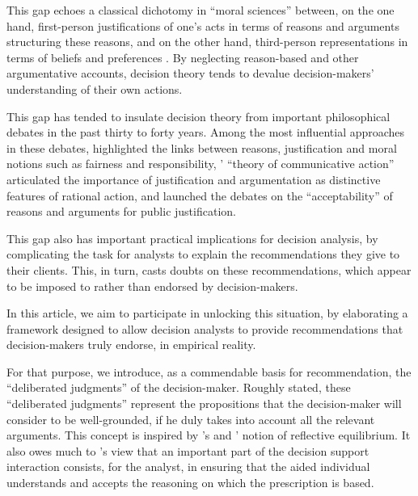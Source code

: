 \documentclass[smallextended,nospthms, natbib]{svjour3}
\begin{document}
This gap echoes a classical dichotomy in “moral sciences” between, on the one hand, first-person justifications of one's acts in terms of reasons and arguments structuring these reasons, and on the other hand, third-person representations in terms of beliefs and preferences \citep{hausman_preference_2011}. By neglecting reason-based and other argumentative accounts, decision theory tends to devalue decision-makers' understanding of their own actions.

This gap has tended to insulate decision theory from important philosophical debates in the past thirty to forty years. Among the most influential approaches in these debates, \citet{scanlon_what_2000} highlighted the links between reasons, justification and moral notions such as fairness and responsibility, \citeauthor{habermas_theorie_1981}’ \citeyearpar{habermas_theorie_1981} “theory of communicative action” articulated the importance of justification and argumentation as distinctive features of rational action, and \citet{rawls_political_2005} launched the debates on the “acceptability” \citep{estlund_democratic_2009} of reasons and arguments for public justification.

This gap also has important practical implications for decision analysis, by complicating the task for analysts to explain the recommendations they give to their clients. This, in turn, casts doubts on these recommendations, which appear to be imposed to rather than endorsed by decision-makers.

In this article, we aim to participate in unlocking this situation, by elaborating a framework designed to allow decision analysts to provide recommendations that decision-makers truly endorse, in empirical reality.

For that purpose, we introduce, as a commendable basis for recommendation, the “deliberated judgments” of the decision-maker. Roughly stated, these “deliberated judgments” represent the propositions that the decision-maker will consider to be well-grounded, if he duly takes into account all the relevant arguments. This concept is inspired by \citeauthor{goodman_fact_1983}’s \citeyearpar{goodman_fact_1983} and \citeauthor{rawls_theory_1999}’ \citeyearpar{rawls_theory_1999} notion of reflective equilibrium. It also owes much to \citeauthor{roy_multicriteria_1996}'s \citeyearpar{roy_multicriteria_1996} view that an important part of the decision support interaction consists, for the analyst, in ensuring that the aided individual understands and accepts the reasoning on which the prescription is based. 
\end{document}
